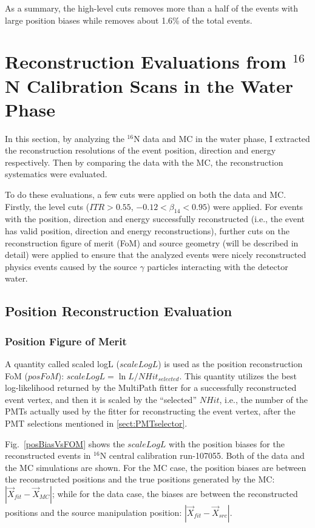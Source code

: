 As a summary, the high-level cuts removes more than a half of the events with large position biases while removes about 1.6\% of the total events. 

\section{Reconstruction Evaluations from $^{16}$N Calibration Scans in the Water Phase}

In this section, by analyzing the $^{16}$N data and MC in the water phase, I extracted the reconstruction resolutions of the event position, direction and energy respectively. Then by comparing the data with the MC, the reconstruction systematics were evaluated.

To do these evaluations, a few cuts were applied on both the data and MC. Firstly, the level cuts  ($ITR>0.55$, $-0.12<\beta_{14}<0.95$) were applied. For events with the position, direction and energy successfully reconstructed (i.e., the event has valid position, direction and energy reconstructions), further cuts on the reconstruction figure of merit (FoM) and source geometry (will be described in detail) were applied to ensure that the analyzed events were nicely reconstructed physics events caused by the source $\gamma$ particles interacting with the detector water.

\subsection{Position Reconstruction Evaluation}
\subsubsection{Position Figure of Merit}
A quantity called scaled logL ($scaleLogL$) is used as the position reconstruction FoM ($posFoM$): $scaleLogL = \ln L/NHit_{selected}$. This quantity utilizes the best log-likelihood returned by the MultiPath fitter for a successfully reconstructed event vertex, and then it is scaled by the ``selected'' $NHit$, i.e., the number of the PMTs actually used by the fitter for reconstructing the event vertex, after the PMT selections mentioned in \ref{sect:PMTselector}.

Fig.~\ref{posBiasVsFOM} shows the $scaleLogL$ with the position biases for the reconstructed events in $^{16}$N central calibration run-107055. Both of the data and the MC simulations are shown. For the MC case, the position biases are between the reconstructed positions and the true positions generated by the MC: $|\vec{X}_{fit}-\vec{X}_{MC}|$; while for the data case, the biases are between the reconstructed positions and the source manipulation position: $|\vec{X}_{fit}-\vec{X}_{src}|$.

